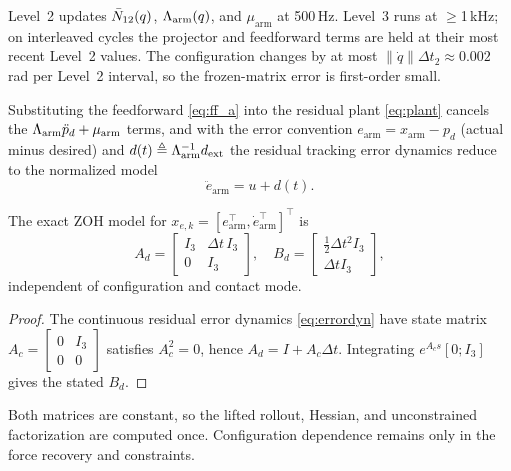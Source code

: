 Level~2 updates $\bar{N}_{12}(q)$, $\Lambda_{\text{arm}}(q)$, and $\mu_{\text{arm}}$ at 500\,Hz.
Level~3 runs at $\geq$1\,kHz; on interleaved cycles the projector and
feedforward terms are held at their most recent Level~2 values.
The configuration changes by at most $\|\dot{q}\|\Delta t_2\approx0.002$\,rad
per Level~2 interval, so the frozen-matrix error is first-order small.

Substituting the feedforward \eqref{eq:ff_a} into the residual plant
\eqref{eq:plant} cancels the $\Lambda_{\text{arm}}\ddot p_d+\mu_{\text{arm}}$ terms, and with
the error convention $e_{\text{arm}}=x_{\text{arm}}-p_d$ (actual minus
desired) and $d(t)\triangleq\Lambda_{\text{arm}}^{-1}d_{\text{ext}}$ the residual tracking
error dynamics reduce to the normalized model
\begin{equation}\label{eq:errordyn}
  \ddot{e}_{\text{arm}} = u+d(t).
\end{equation}

\begin{proposition}
\label{prop:constant_Ad}
The exact ZOH model for
$x_{e,k}=[e_{\text{arm}}^\top,\dot{e}_{\text{arm}}^\top]^\top$ is
\begin{equation}\label{eq:Ad}
  A_d = \begin{bmatrix}I_3 & \Delta t\,I_3 \\ 0 & I_3\end{bmatrix},
  \quad
  B_d = \begin{bmatrix}\frac12\Delta t^2 I_3 \\ \Delta t I_3\end{bmatrix},
\end{equation}
independent of configuration and contact mode.
\end{proposition}

\begin{proof}
The continuous residual error dynamics \eqref{eq:errordyn} have state matrix
$A_c=\left[\begin{smallmatrix}0&I_3\\0&0\end{smallmatrix}\right]$ satisfies
$A_c^2=0$, hence $A_d=I+A_c\Delta t$. Integrating
$e^{A_cs}[0;I_3]$ gives the stated $B_d$.
\end{proof}

Both matrices are constant, so the lifted rollout, Hessian, and unconstrained
factorization are computed once. Configuration dependence remains only in
the force recovery and constraints.


